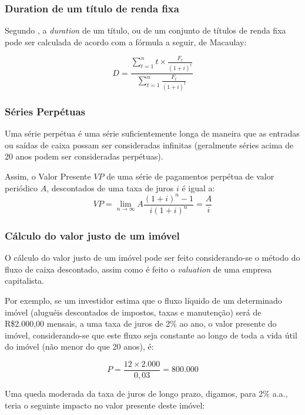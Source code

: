 \documentclass[
	12pt,				%
	oneside,			%
	a4paper,			%
	chapter=TITLE,		%
	section=TITLE,		%
	english,			%
	brazil				%
	]{abntex2}
\begin{document}
\subsubsection{Duration de um título de renda
fixa}\label{duration-de-um-tuxedtulo-de-renda-fixa}

Segundo \textcite{marins1}, a \emph{duration} de um título, ou de um
conjunto de títulos de renda fixa pode ser calculada de acordo com a
fórmula a seguir, de Macaulay:

\[D = \frac{\sum_{t = 1}^{n} t \times \frac{F_t}{(1+i)^t}}{\sum_{t = 1}^{n} \frac{F_t}{(1+i)^t}}\]

\subsubsection{Séries Perpétuas}\label{suxe9ries-perpuxe9tuas}

Uma série perpétua é uma série suficientemente longa de maneira que as
entradas ou saídas de caixa possam ser consideradas infinitas
(geralmente séries acima de 20 anos podem ser consideradas perpétuas).

Assim, o Valor Presente \(VP\) de uma série de pagamentos perpétua de
valor periódico \(A\), descontados de uma taxa de juros \(i\) é igual a:
\begin{equation}
VP = \lim_{n \to \infty} A \frac{(1+i)^n-1}{i(1+i)^n}= \frac{A}{i}
\label{eq:perpetua}
\end{equation}
\subsubsection{Cálculo do valor justo de um
imóvel}\label{cuxe1lculo-do-valor-justo-de-um-imuxf3vel}

O cálculo do valor justo de um imóvel pode ser feito considerando-se o
método do fluxo de caixa descontado, assim como é feito o
\emph{valuation} de uma empresa capitalista.

Por exemplo, se um investidor estima que o fluxo líquido de um
determinado imóvel (aluguéis descontados de impostos, taxas e
manutenção) será de R\$2.000,00 mensais, a uma taxa de juros de 2\% ao
ano, o valor presente do imóvel, considerando-se que este fluxo seja
constante ao longo de toda a vida útil do imóvel (não menor do que 20
anos), é:

\[P = \frac{12 \times 2.000}{0,03} = 800.000\]

Uma queda moderada da taxa de juros de longo prazo, digamos, para 2\%
a.a., teria o seguinte impacto no valor presente deste imóvel:
\end{document}
